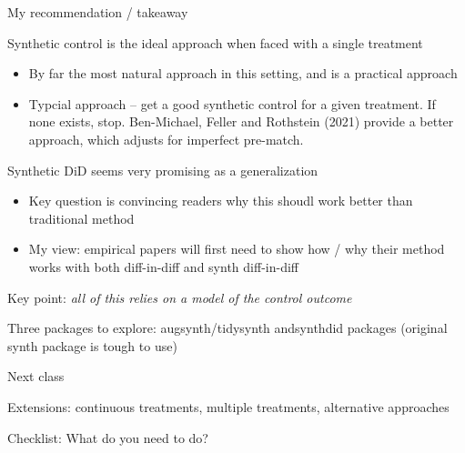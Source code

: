 \documentclass[notes,11pt, aspectratio=169]{beamer}
\newenvironment{wideitemize}{\itemize\addtolength{\itemsep}{10pt}}{\enditemize}
\begin{document}
\begin{frame}{My recommendation / takeaway}
  \begin{wideitemize}
  \item Synthetic control is the ideal approach when faced with a single treatment
    \begin{itemize}
    \item By far the most natural approach in this setting, and is a practical approach
    \item Typcial approach -- get a good synthetic control for a given
      treatment. If none exists, stop. Ben-Michael, Feller and
      Rothstein (2021) provide a better approach, which adjusts for
      imperfect pre-match.
    \end{itemize}
  \item Synthetic DiD seems very promising as a generalization
    \begin{itemize}
    \item Key question is convincing readers why this shoudl work better than traditional method
    \item My view: empirical papers will first need to show how / why
      their method works with both diff-in-diff and synth diff-in-diff
    \end{itemize}
  \item Key point: \emph{all of this relies on a model of the control outcome}
  \item Three packages to explore: augsynth/tidysynth andsynthdid
    packages (original synth package is tough to use)
  \end{wideitemize}
\end{frame}

\begin{frame}{Next class}
  \begin{wideitemize}
    \item Extensions: continuous treatments, multiple treatments,
      alternative approaches
    \item Checklist: What do you need to do?
    \end{wideitemize}
\end{frame}
\end{document}

